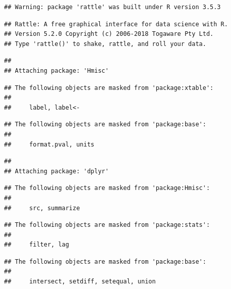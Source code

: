 \documentclass[]{article}
\begin{document}
\begin{verbatim}
## Warning: package 'rattle' was built under R version 3.5.3
\end{verbatim}

\begin{verbatim}
## Rattle: A free graphical interface for data science with R.
## Version 5.2.0 Copyright (c) 2006-2018 Togaware Pty Ltd.
## Type 'rattle()' to shake, rattle, and roll your data.
\end{verbatim}

\begin{verbatim}
## 
## Attaching package: 'Hmisc'
\end{verbatim}

\begin{verbatim}
## The following objects are masked from 'package:xtable':
## 
##     label, label<-
\end{verbatim}

\begin{verbatim}
## The following objects are masked from 'package:base':
## 
##     format.pval, units
\end{verbatim}

\begin{verbatim}
## 
## Attaching package: 'dplyr'
\end{verbatim}

\begin{verbatim}
## The following objects are masked from 'package:Hmisc':
## 
##     src, summarize
\end{verbatim}

\begin{verbatim}
## The following objects are masked from 'package:stats':
## 
##     filter, lag
\end{verbatim}

\begin{verbatim}
## The following objects are masked from 'package:base':
## 
##     intersect, setdiff, setequal, union
\end{verbatim}
\end{document}
